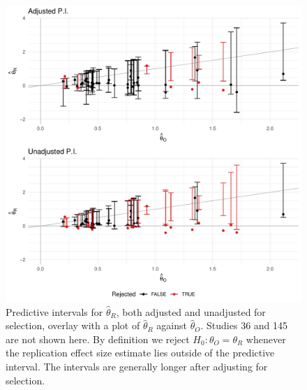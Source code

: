 \documentclass[aoas, preprint]{imsart}
\theoremstyle{definition}
\theoremstyle{custom}
\newcommand{\htheta}{\hat{\theta}}
\begin{document}
  \begin{figure}[htbp]
    \centering
    \includegraphics[width=\hsize]{pi}
    \caption{Predictive intervals for $\htheta_R$, both adjusted and unadjusted for selection, overlay with a plot of $\htheta_R$ against $\htheta_O$. Studies 36 and 145 are not shown here. By definition we reject $H_0: \theta_O = \theta_R$ whenever the replication effect size estimate lies outside of the predictive interval. The intervals are generally longer after adjusting for selection.}
  \label{fig:pi}
  \end{figure}
\end{document}
